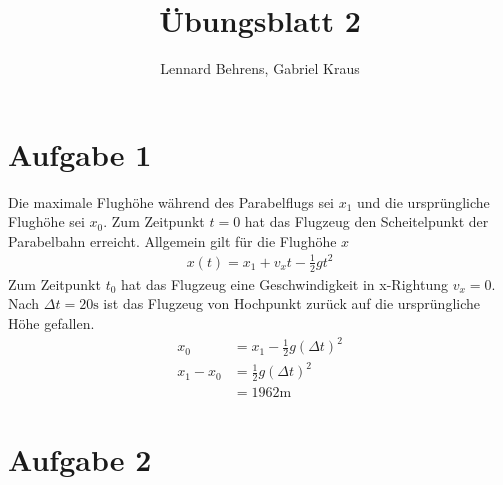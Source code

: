 \documentclass[a4paper,11pt]{article}
\title{Übungsblatt 2}
\author{Lennard Behrens, Gabriel Kraus}
\begin{document}
\maketitle

\section*{Aufgabe 1}
Die maximale Flughöhe während des Parabelflugs sei $x_1$ und die ursprüngliche Flughöhe sei $x_0$. Zum Zeitpunkt $t=0$ hat das Flugzeug den Scheitelpunkt der Parabelbahn erreicht. Allgemein gilt für die Flughöhe $x$
\begin{align*}
  x(t) = x_1 + v_xt- \frac{1}{2} g t^2
\end{align*} 
Zum Zeitpunkt $t_0$ hat das Flugzeug eine Geschwindigkeit in x-Rightung $v_x=0$. Nach $\Delta t = 20 \mbox{s}$ ist das Flugzeug von Hochpunkt zurück auf die ursprüngliche Höhe gefallen. 
\begin{align*}
  x_0 &= x_1 - \frac{1}{2} g (\Delta t)^2 \\
  x_1 - x_0 &= \frac{1}{2} g (\Delta t)^2 \\
  &= 1962 \mbox{m}
\end{align*}

\section*{Aufgabe 2}
\end{document}
